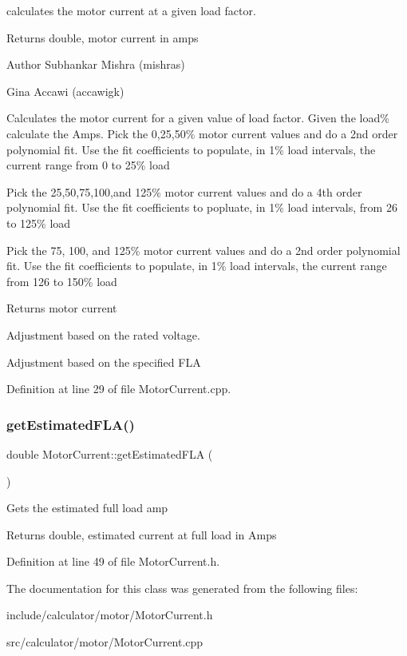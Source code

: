 calculates the motor current at a given load factor. \begin{DoxyReturn}{Returns}
double, motor current in amps
\end{DoxyReturn}
\begin{DoxyAuthor}{Author}
Subhankar Mishra (mishras) 

Gina Accawi (accawigk) 
\end{DoxyAuthor}
Calculates the motor current for a given value of load factor. Given the load\% calculate the Amps. Pick the 0,25,50\% motor current values and do a 2nd order polynomial fit. Use the fit coefficients to populate, in 1\% load intervals, the current range from 0 to 25\% load

Pick the 25,50,75,100,and 125\% motor current values and do a 4th order polynomial fit. Use the fit coefficients to popluate, in 1\% load intervals, from 26 to 125\% load

Pick the 75, 100, and 125\% motor current values and do a 2nd order polynomial fit. Use the fit coefficients to populate, in 1\% load intervals, the current range from 126 to 150\% load \begin{DoxyReturn}{Returns}
motor current 
\end{DoxyReturn}
Adjustment based on the rated voltage.

Adjustment based on the specified F\+LA 

Definition at line 29 of file Motor\+Current.\+cpp.

\mbox{\label{class_motor_current_a0f845ec03585b21a8e476ed3e63f365f}} 
\subsubsection{\texorpdfstring{get\+Estimated\+F\+L\+A()}{getEstimatedFLA()}}
{\footnotesize\ttfamily double Motor\+Current\+::get\+Estimated\+F\+LA (\begin{DoxyParamCaption}{ }\end{DoxyParamCaption})\hspace{0.3cm}{\ttfamily [inline]}}

Gets the estimated full load amp

\begin{DoxyReturn}{Returns}
double, estimated current at full load in Amps 
\end{DoxyReturn}


Definition at line 49 of file Motor\+Current.\+h.



The documentation for this class was generated from the following files\+:\begin{DoxyCompactItemize}
\item 
include/calculator/motor/Motor\+Current.\+h\item 
src/calculator/motor/Motor\+Current.\+cpp\end{DoxyCompactItemize}
